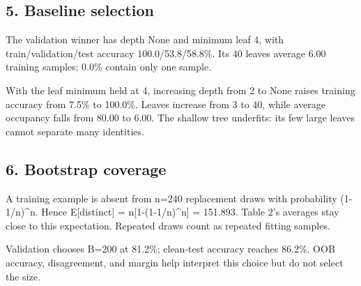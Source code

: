 \documentclass[10pt,twocolumn,letterpaper]{article}
\begin{document}
\subsection*{5. Baseline selection}
The validation winner has depth None and minimum leaf 4, with train/validation/test accuracy 100.0/53.8/58.8\%. Its 40 leaves average 6.00 training samples; 0.0\% contain only one sample.

With the leaf minimum held at 4, increasing depth from 2 to None raises training accuracy from 7.5\% to 100.0\%. Leaves increase from 3 to 40, while average occupancy falls from 80.00 to 6.00. The shallow tree underfits: its few large leaves cannot separate many identities.

\newpage
\subsection*{6. Bootstrap coverage}
A training example is absent from n=240 replacement draws with probability (1-1/n)\textasciicircum{}n. Hence E[distinct] = n[1-(1-1/n)\textasciicircum{}n] = 151.893. Table 2's averages stay close to this expectation. Repeated draws count as repeated fitting samples.

Validation chooses B=200 at 81.2\%; clean-test accuracy reaches 86.2\%. OOB accuracy, disagreement, and margin help interpret this choice but do not select the size.
\end{document}
